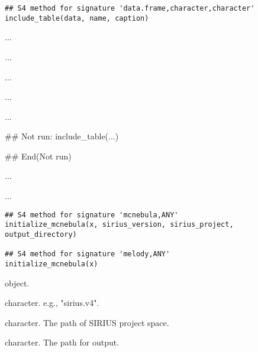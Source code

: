 \documentclass[letterpaper]{book}
\begin{document}
%
\begin{Usage}
\begin{verbatim}
## S4 method for signature 'data.frame,character,character'
include_table(data, name, caption)
\end{verbatim}
\end{Usage}
%
\begin{Arguments}
\begin{ldescription}
\item[\code{data}] ...

\item[\code{name}] ...

\item[\code{caption}] ...
\end{ldescription}
\end{Arguments}
%
\begin{Details}\relax
...
\end{Details}
%
\begin{Value}
...
\end{Value}
%
\begin{SeeAlso}\relax
{}
\end{SeeAlso}
%
\begin{Examples}
\begin{ExampleCode}
## Not run: 
include_table(...)

## End(Not run)
\end{ExampleCode}
\end{Examples}
%
\begin{Description}\relax
...

...
\end{Description}
%
\begin{Usage}
\begin{verbatim}
## S4 method for signature 'mcnebula,ANY'
initialize_mcnebula(x, sirius_version, sirius_project, output_directory)

## S4 method for signature 'melody,ANY'
initialize_mcnebula(x)
\end{verbatim}
\end{Usage}
%
\begin{Arguments}
\begin{ldescription}
\item[\code{x}]  object.

\item[\code{sirius\_version}] character. e.g., "sirius.v4".

\item[\code{sirius\_project}] character. The path of SIRIUS project space.

\item[\code{output\_directory}] character. The path for output.
\end{ldescription}
\end{Arguments}
\end{document}
